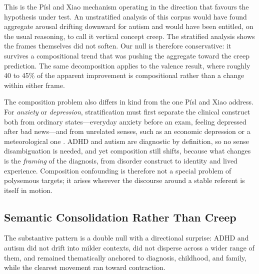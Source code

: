 \documentclass[final]{clv2025}
\begin{document}
This is the Písl and Xiao mechanism operating in the direction that favours the hypothesis
under test. An unstratified analysis of this corpus would have found aggregate arousal
drifting downward for autism and would have been entitled, on the usual reasoning, to call
it vertical concept creep. The stratified analysis shows the frames themselves did not
soften. Our null is therefore conservative: it survives a compositional trend that was
pushing the aggregate toward the creep prediction. The same decomposition applies to the
valence result, where roughly 40 to 45\% of the apparent improvement is compositional rather
than a change within either frame.

The composition problem also differs in kind from the one Písl and Xiao address. For
\emph{anxiety} or \emph{depression}, stratification must first separate the clinical
construct both from ordinary states---everyday anxiety before an exam, feeling depressed
after bad news---and from unrelated senses, such as an economic depression or a
meteorological one \citep{xiaoHaveConceptsAnxiety2023}. ADHD and autism are diagnostic by
definition, so no sense disambiguation is needed, and yet composition still shifts, because
what changes is the \emph{framing} of the diagnosis, from disorder construct to identity and
lived experience. Composition confounding is therefore not a special problem of polysemous
targets; it arises wherever the discourse around a stable referent is itself in motion.

\subsection{Semantic Consolidation Rather Than Creep}

The substantive pattern is a double null with a directional surprise: ADHD and autism did
not drift into milder contexts, did not disperse across a wider range of them, and remained
thematically anchored to diagnosis, childhood, and family, while the clearest movement ran
toward contraction.
\end{document}
